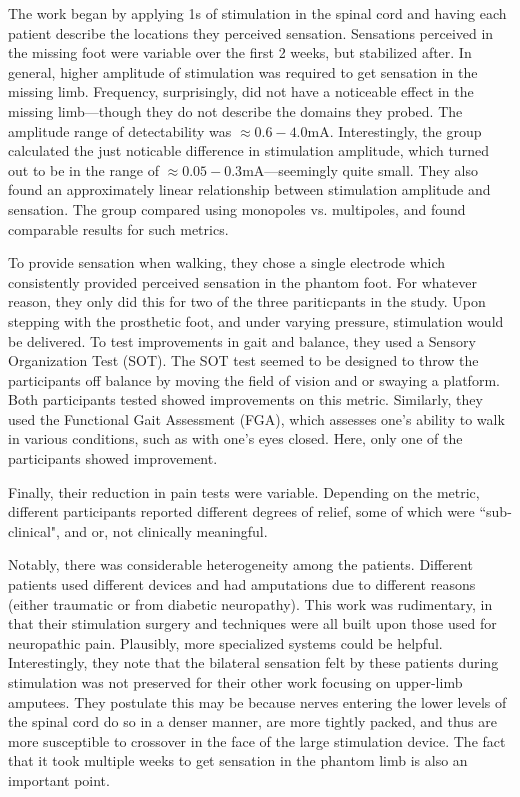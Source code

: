 The work began by applying 1s of stimulation in the spinal cord and having each patient describe the locations they perceived sensation. Sensations perceived in the missing foot were variable over the first 2 weeks, but stabilized after. In general, higher amplitude of stimulation was required to get sensation in the missing limb. Frequency, surprisingly, did not have a noticeable effect in the missing limb---though they do not describe the domains they probed. The amplitude range of detectability was $\approx 0.6 - 4.0$mA. Interestingly, the group calculated the just noticable difference in stimulation amplitude, which turned out to be in the range of $\approx 0.05 - 0.3$mA---seemingly quite small. They also found an approximately linear relationship between stimulation amplitude and sensation. The group compared using monopoles vs. multipoles, and found comparable results for such metrics.\newline

To provide sensation when walking, they chose a single electrode which consistently provided perceived sensation in the phantom foot. For whatever reason, they only did this for two of the three pariticpants in the study. Upon stepping with the prosthetic foot, and under varying pressure, stimulation would be delivered. To test improvements in gait and balance, they used a Sensory Organization Test (SOT). The SOT test seemed to be designed to throw the participants off balance by moving the field of vision and or swaying a platform. Both participants tested showed improvements on this metric. Similarly, they used the Functional Gait Assessment (FGA), which assesses one's ability to walk in various conditions, such as with one's eyes closed. Here, only one of the participants showed improvement.\newline

Finally, their reduction in pain tests were variable. Depending on the metric, different participants reported different degrees of relief, some of which were ``sub-clinical", and or, not clinically meaningful.\newline

Notably, there was considerable heterogeneity among the patients. Different patients used different devices and had amputations due to different reasons (either traumatic or from diabetic neuropathy). This work was rudimentary, in that their stimulation surgery and techniques were all built upon those used for neuropathic pain. Plausibly, more specialized systems could be helpful. Interestingly, they note that the bilateral sensation felt by these patients during stimulation was not preserved for their other work focusing on upper-limb amputees. They postulate this may be because nerves entering the lower levels of the spinal cord do so in a denser manner, are more tightly packed, and thus are more susceptible to crossover in the face of the large stimulation device. The fact that it took multiple weeks to get sensation in the phantom limb is also an important point.\newline

